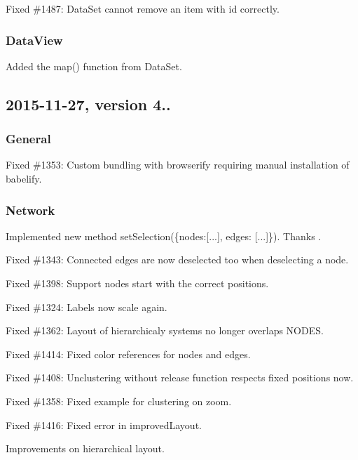 \begin{DoxyItemize}
\item Fixed \#1487\+: Data\+Set cannot remove an item with id {} correctly.
\end{DoxyItemize}

\subsubsection*{Data\+View}


\begin{DoxyItemize}
\item Added the map() function from Data\+Set.
\end{DoxyItemize}

\subsection*{2015-\/11-\/27, version 4..}

\subsubsection*{General}


\begin{DoxyItemize}
\item Fixed \#1353\+: Custom bundling with browserify requiring manual installation of {\ttfamily babelify}.
\end{DoxyItemize}

\subsubsection*{Network}


\begin{DoxyItemize}
\item Implemented new method {\ttfamily set\+Selection(\{nodes\+:\mbox{[}...\mbox{]}, edges\+: \mbox{[}...\mbox{]}\})}. Thanks .
\item Fixed \#1343\+: Connected edges are now deselected too when deselecting a node.
\item Fixed \#1398\+: Support nodes start with the correct positions.
\item Fixed \#1324\+: Labels now scale again.
\item Fixed \#1362\+: Layout of hierarchicaly systems no longer overlaps N\+O\+D\+ES.
\item Fixed \#1414\+: Fixed color references for nodes and edges.
\item Fixed \#1408\+: Unclustering without release function respects fixed positions now.
\item Fixed \#1358\+: Fixed example for clustering on zoom.
\item Fixed \#1416\+: Fixed error in improved\+Layout.
\item Improvements on hierarchical layout.
\end{DoxyItemize}

